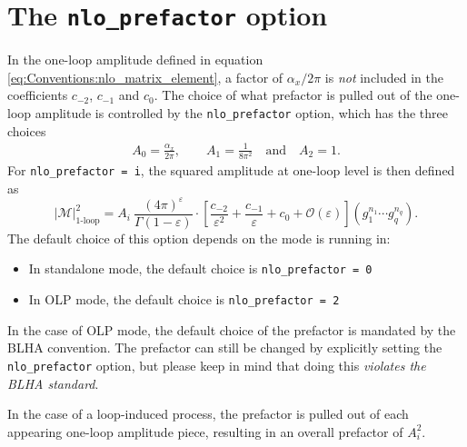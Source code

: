 \section{The \texttt{nlo\_prefactor} option}
\label{sec:nlo_prefactors}
In the one-loop amplitude defined in equation \eqref{eq:Conventions:nlo_matrix_element}, a factor of $\alpha_x/2\pi$ is \emph{not} included in the coefficients $c_{-2}$, $c_{-1}$ and $c_0$. The choice of what prefactor is pulled out of the one-loop amplitude is controlled by the \texttt{nlo\_prefactor} option, which has the three choices
\begin{eqnarray}
   A_0 = \frac{\alpha_x}{2\pi}, \qquad A_1 = \frac{1}{8 \pi^2} \quad \text{and} \quad A_2 = 1.
\end{eqnarray}
For \texttt{nlo\_prefactor = i}, the squared amplitude at one-loop level is then defined as
\begin{equation}
   \left|\mathcal{M}\right|^2_{\text{1-loop}}=
A_i\ \frac{(4\pi)^\varepsilon}{\Gamma(1-\varepsilon)}
\cdot\left[\frac{c_{-2}}{\varepsilon^2}+\frac{c_{-1}}{\varepsilon}+c_0
+{\mathcal{O}}(\varepsilon)\right](g_1^{n_1}\cdots g_q^{n_q}).
\end{equation}
The default choice of this option depends on the mode \gosam is running in:
\begin{itemize}
   \item In standalone mode, the default choice is \texttt{nlo\_prefactor = 0}
   \item In OLP mode, the default choice is \texttt{nlo\_prefactor = 2}
\end{itemize}
In the case of OLP mode, the default choice of the prefactor is mandated by the BLHA convention. The prefactor can still be changed by explicitly setting the \texttt{nlo\_prefactor} option, but please keep in mind that doing this \emph{violates the BLHA standard}.

In the case of a loop-induced process, the prefactor is pulled out of each appearing one-loop amplitude piece, resulting in an overall prefactor of $A_i^2$.

